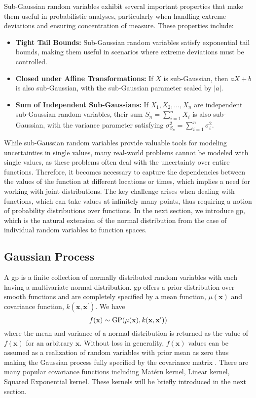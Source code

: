 Sub-Gaussian random variables exhibit several important properties that make them useful in probabilistic analyses, particularly when handling extreme deviations and ensuring concentration of measure. These properties include:  
\begin{itemize}
    \item \textbf{Tight Tail Bounds:} Sub-Gaussian random variables satisfy exponential tail bounds, making them useful in scenarios where extreme deviations must be controlled.  
    \item \textbf{Closed under Affine Transformations:} If \( X \) is sub-Gaussian, then \( aX + b \) is also sub-Gaussian, with the sub-Gaussian parameter scaled by \( |a| \).  
    \item \textbf{Sum of Independent Sub-Gaussians:} If \( X_1, X_2, \dots, X_n \) are independent sub-Gaussian random variables, their sum \( S_n = \sum_{i=1}^n X_i \) is also sub-Gaussian, with the variance parameter satisfying \( \sigma^2_{S_n} = \sum_{i=1}^n \sigma_i^2 \).  
\end{itemize} 

While sub-Gaussian random variables provide valuable tools for modeling uncertainties in single values, many real-world problems cannot be modeled with single values, as these problems often deal with the uncertainty over entire functions. Therefore, it becomes necessary to capture the dependencies between the values of the function at different locations or times, which implies a need for working with joint distributions. The key challenge arises when dealing with functions, which can take values at infinitely many points, thus requiring a notion of probability distributions over functions. In the next section,  we introduce \acf{gp}, which is the natural extension of the normal distribution from the case of individual random variables to function spaces.

\subsection{Gaussian Process}
\label{section:gaussian_process}
A \acf{gp} is a finite collection of normally distributed random variables with each having a multivariate normal distribution. \ac{gp} offers a prior distribution over smooth functions and are completely specified by a mean function, $\mu(\mathbf{x})$ and covariance function, $k(\mathbf{x}, \mathbf{x}^\prime)$. We have \begin{equation}
    \label{def:GP}
    f({\bf x})\sim\mathrm{GP}(\mu({\bf x}),k({\bf x},{\bf x}^\prime))
\end{equation}
where the mean and variance of a normal distribution is returned as the value of $f(\mathbf{x})$ for an arbitrary $\mathbf{x}$. Without loss in generality, $f(\mathbf{x})$ values can be assumed as a realization of random variables with prior mean as zero thus making the Gaussian process fully specified by the covariance matrix \citep{rasmussen2006gaussian}. There are many popular covariance functions including Mat\'ern kernel, Linear kernel, Squared Exponential kernel. These kernels will be briefly introduced in the next section.

